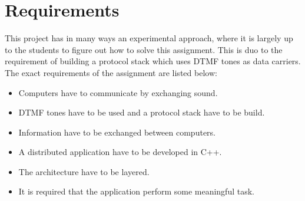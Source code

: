 \section{Requirements}
This project has in many ways an experimental approach, where it is largely up to the students to figure out how to solve this assignment. This is duo to the requirement of building a protocol stack which uses DTMF tones as data carriers. The exact requirements of the assignment are listed below:

\begin{itemize}
\item Computers have to communicate by exchanging sound.
\item DTMF tones have to be used and a protocol stack have to be build.
\item Information have to be exchanged between computers.
\item A distributed application have to be developed in C++.
\item The architecture have to be layered.
\item It is required that the application perform some meaningful task.
\end{itemize}